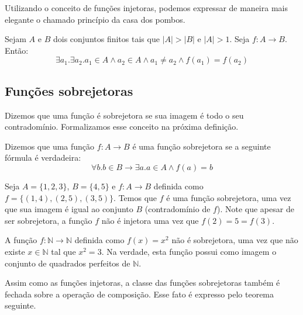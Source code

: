 Utilizando o conceito de funções injetoras, podemos expressar de
maneira mais elegante o chamado princípio da casa dos pombos.

\begin{Theorem}
Sejam $A$ e $B$ dois conjuntos finitos tais que $|A| > |B|$ e $|A| >
1$. Seja $f : A \to B$. Então:
\[
\exists a_1. \exists a_2. a_1 \in A \land a_2 \in A \land a_1 \neq a_2
\land f(a_1) = f(a_2)
\]
\end{Theorem}


\subsection{Funções sobrejetoras}

Dizemos que uma função é sobrejetora se sua imagem é todo o seu
contradomínio. Formalizamos esse conceito na próxima definição.

\begin{Definition}
Dizemos que uma função $f : A \to B$ é uma função sobrejetora se a
seguinte fórmula é verdadeira:
\[
\forall b. b\in B \to \exists a. a \in A \land f(a) = b
\]
\end{Definition}

\begin{Example}
Seja $A =\{1,2,3\}$, $B =\{4,5\}$ e  $f : A \to B$ definida como $f
=\{(1,4),(2,5),(3,5)\}$. Temos que $f$ é uma função sobrejetora, uma
vez que sua imagem é igual ao conjunto $B$ (contradomínio de
$f$). Note que apesar de ser sobrejetora, a função $f$ não é
injetora uma vez que $f(2) = 5 = f(3)$.
\end{Example}

\begin{Example}
A função $f : \mathbb{N} \to \mathbb{N}$ definida como $f(x) = x^2$
não é sobrejetora, uma vez que não existe $x \in \mathbb{N}$ tal que
$x^2 = 3$. Na verdade, esta função possui como imagem o conjunto de
quadrados perfeitos de $\mathbb{N}$.
\end{Example}

Assim como as funções injetoras, a classe das funções sobrejetoras
também é fechada sobre a operação de composição. Esse fato é expresso
pelo teorema seguinte.

